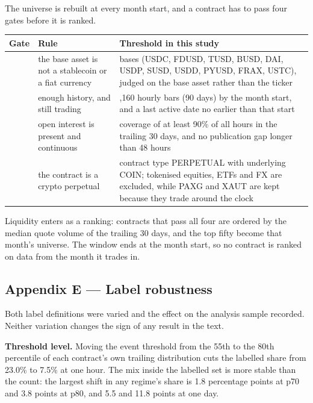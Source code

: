 \documentclass[11pt,a4paper]{article}
\begin{document}
{The universe is rebuilt at every month start, and a contract has to pass four gates before it is ranked.

\begin{table}[H]\centering
\footnotesize
\begin{tabularx}{\linewidth}{>{\raggedleft\arraybackslash}X>{\raggedright\arraybackslash}X>{\raggedright\arraybackslash}X}
\toprule
Gate & Rule & Threshold in this study \\
\midrule
1 & the base asset is not a stablecoin or a fiat currency & 11 bases (USDC, FDUSD, TUSD, BUSD, DAI, USDP, SUSD, USDD, PYUSD, FRAX, USTC), judged on the base asset rather than the ticker \\
2 & enough history, and still trading & 2,160 hourly bars (90 days) by the month start, and a last active date no earlier than that start \\
3 & open interest is present and continuous & coverage of at least 90\% of all hours in the trailing 30 days, and no publication gap longer than 48 hours \\
4 & the contract is a crypto perpetual & contract type PERPETUAL with underlying COIN; tokenised equities, ETFs and FX are excluded, while PAXG and XAUT are kept because they trade around the clock \\
\bottomrule
\end{tabularx}
\end{table}

Liquidity enters as a ranking: contracts that pass all four are ordered by the median quote volume of the trailing 30 days, and the top fifty become that month's universe. The window ends at the month start, so no contract is ranked on data from the month it trades in.

\subsection*{Appendix E --- Label robustness}

Both label definitions were varied and the effect on the analysis sample recorded. Neither variation changes the sign of any result in the text.

\textbf{Threshold level.} Moving the event threshold from the 55th to the 80th percentile of each contract's own trailing distribution cuts the labelled share from 23.0\% to 7.5\% at one hour. The mix inside the labelled set is more stable than the count: the largest shift in any regime's share is 1.8 percentage points at p70 and 3.8 points at p80, and 5.5 and 11.8 points at one day.

}
\end{document}
